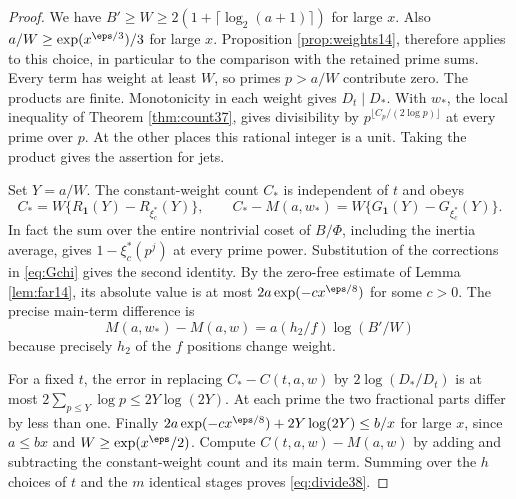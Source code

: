 \documentclass[a4paper,11pt]{article}
\theoremstyle{definition}
\theoremstyle{remark}
\numberwithin{equation}{section}
\begin{document}
\begin{proof}
We have \(B'\ge W\ge2(1+\lceil\log_2(a+1)\rceil)\) for large \(x\). Also \(a/W\ge\exp(x^{\eps/3})/3\) for large \(x\). Proposition \ref{prop:weights14}, therefore applies to this choice, in particular to the comparison with the retained prime sums. Every term has weight at least \(W\), so primes \(p>a/W\) contribute zero. The products are finite. Monotonicity in each weight gives \(D_t\mid D_*\). With \(w_*\), the local inequality of Theorem \ref{thm:count37}, gives divisibility by \(p^{\lfloor C_p/(2\log p)\rfloor}\) at every prime over \(p\). At the other places this rational integer is a unit. Taking the product gives the assertion for jets.

Set \(Y=a/W\). The constant-weight count \(C_*\) is independent of \(t\) and obeys
\[
        C_*=W\{R_{\mathbf1}(Y)-R_{\xi_c^*}(Y)\},\qquad
        C_*-M(a,w_*)=W\{G_{\mathbf1}(Y)-G_{\xi_c^*}(Y)\}.
\]
In fact the sum over the entire nontrivial coset of \(B/\Phi\), including the inertia average, gives \(1-\xi_c^*(p^j)\) at every prime power. Substitution of the corrections in \eqref{eq:Gchi} gives the second identity. By the zero-free estimate of Lemma \ref{lem:far14}, its absolute value is at most \(2a\exp(-c x^{\eps/8})\) for some \(c>0\). The precise main-term difference is
\[
            M(a,w_*)-M(a,w)=a(h_2/f)\log(B'/W)
\]
because precisely \(h_2\) of the \(f\) positions change weight.

For a fixed \(t\), the error in replacing \(C_*-C(t,a,w)\) by \(2\log(D_*/D_t)\) is at most \(2\sum_{p\le Y}\log p\le 2Y\log(2Y)\). At each prime the two fractional parts differ by less than one. Finally \(2a\exp(-c x^{\eps/8})+2Y\log(2Y)\le b/x\) for large \(x\), since \(a\le bx\) and \(W\ge\exp(x^\eps/2)\). Compute \(C(t,a,w)-M(a,w)\) by adding and subtracting the constant-weight count and its main term. Summing over the \(h\) choices of \(t\) and the \(m\) identical stages proves \eqref{eq:divide38}.
\end{proof}
\end{document}
